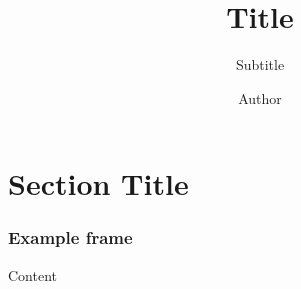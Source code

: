 \documentclass{xbeamer}
\title{Title}
\author{Author}
\institute{Institute}
\subtitle{Subtitle}
\begin{document}
\maketitle

\section{Section Title}

\begin{frame}
  \frametitle{Example frame}
  Content
\end{frame}
\end{document}
